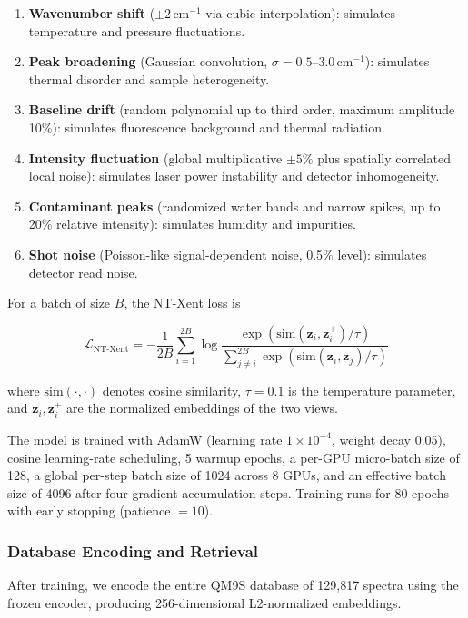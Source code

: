 \documentclass[conference]{IEEEtran}
\begin{document}
\begin{enumerate}
    \item \textbf{Wavenumber shift} ($\pm2$\,cm$^{-1}$ via cubic interpolation): simulates temperature and pressure fluctuations.
    \item \textbf{Peak broadening} (Gaussian convolution, $\sigma=0.5$--3.0\,cm$^{-1}$): simulates thermal disorder and sample heterogeneity.
    \item \textbf{Baseline drift} (random polynomial up to third order, maximum amplitude 10\%): simulates fluorescence background and thermal radiation.
    \item \textbf{Intensity fluctuation} (global multiplicative $\pm5\%$ plus spatially correlated local noise): simulates laser power instability and detector inhomogeneity.
    \item \textbf{Contaminant peaks} (randomized water bands and narrow spikes, up to 20\% relative intensity): simulates humidity and impurities.
    \item \textbf{Shot noise} (Poisson-like signal-dependent noise, 0.5\% level): simulates detector read noise.
\end{enumerate}

For a batch of size $B$, the NT-Xent loss is

\begin{equation}
\mathcal{L}_{\text{NT-Xent}}
=
-\frac{1}{2B}
\sum_{i=1}^{2B}
\log
\frac{
\exp(\mathrm{sim}(\mathbf{z}_i,\mathbf{z}_i^{+})/\tau)
}{
\sum_{j\neq i}^{2B}
\exp(\mathrm{sim}(\mathbf{z}_i,\mathbf{z}_j)/\tau)
}
\end{equation}

where $\mathrm{sim}(\cdot,\cdot)$ denotes cosine similarity, $\tau=0.1$ is the temperature parameter, and $\mathbf{z}_i,\mathbf{z}_i^{+}$ are the normalized embeddings of the two views.

The model is trained with AdamW (learning rate $1\times10^{-4}$, weight decay 0.05), cosine learning-rate scheduling, 5 warmup epochs, a per-GPU micro-batch size of 128, a global per-step batch size of 1024 across 8 GPUs, and an effective batch size of 4096 after four gradient-accumulation steps. Training runs for 80 epochs with early stopping (patience $=10$).

\subsubsection{Database Encoding and Retrieval}

After training, we encode the entire QM9S database of 129,817 spectra using the frozen encoder, producing 256-dimensional L2-normalized embeddings.
\end{document}
